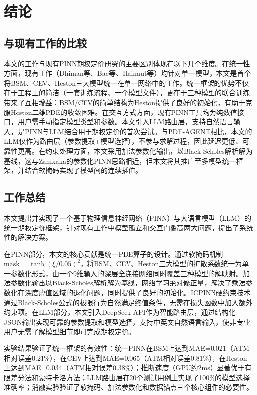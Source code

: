 \chapter{结论}\label{chap:conclusion}

\section{与现有工作的比较}\label{sec:comparison_related}

本文的工作与现有PINN期权定价研究的主要区别体现在以下几个维度。在统一性方面，现有工作（Dhiman等\cite{dhiman2023pinn}、Bae等\cite{bae2024localvol}、Hainaut等\cite{hainaut2024heston}）均针对单一模型，本文是首个将BSM、CEV、Heston三大模型统一在单一网络中的工作。统一框架的优势不仅在于工程上的简洁（一套训练流程、一个模型文件），更在于三种模型的联合训练带来了互相增益：BSM/CEV的简单结构为Heston提供了良好的初始化，有助于克服Heston二维PDE的收敛困难。在交互方式方面，现有PINN工具均为纯数值接口，用户需手动指定模型类型和参数。本文引入LLM路由层，支持自然语言输入，是PINN与LLM结合用于期权定价的首次尝试。与PDE-AGENT\cite{liu2025pdeagent}相比，本文的LLM仅作为路由层（参数提取+模型选择），不参与求解过程，因此延迟更低、可靠性更高。在约束处理方面，本文采用加法参数化输出，以Black-Scholes解析解为基线，这与Zamxaka\cite{zamxaka2023cev}的参数化PINN思路相近，但本文将其推广至多模型统一框架，并结合软掩码实现了模型间的连续插值。

\section{工作总结}\label{sec:summary}

本文提出并实现了一个基于物理信息神经网络（PINN）与大语言模型（LLM）的统一期权定价框架，针对现有工作中模型孤立和交互门槛高两大问题，提出了系统性的解决方案。

在PINN部分，本文的核心贡献是统一PDE算子的设计。通过软掩码机制$\text{mask}=\tanh(\xi/0.05)^2$，将BSM、CEV、Heston三大模型的扩散系数统一为单一参数化形式，由一个9维输入的深层全连接网络同时覆盖三种模型的解映射。加法参数化输出以Black-Scholes解析解为基线，网络学习绝对修正量，解决了乘法参数化在深度虚值区域的退化问题，同时提供了良好的初始化。ICPINN硬约束技术通过Black-Scholes公式的极限行为自然满足终值条件，无需在损失函数中加入额外约束项。在LLM部分，本文引入DeepSeek API作为智能路由层，通过结构化JSON输出实现可靠的参数提取和模型选择，支持中英文自然语言输入，使非专业用户无需了解模型细节即可完成期权定价。

实验结果验证了统一框架的有效性：统一PINN在BSM上达到MAE=0.021（ATM相对误差0.21\%），在CEV上达到MAE=0.065（ATM相对误差0.81\%），在Heston上达到MAE=0.034（ATM相对误差0.38\%）；推断速度（GPU约2ms）显著优于有限差分法和蒙特卡洛方法；LLM路由层在20个测试用例上实现了100\%的模型选择准确率；消融实验验证了软掩码、加法参数化和数据锚点三个核心组件的必要性。

